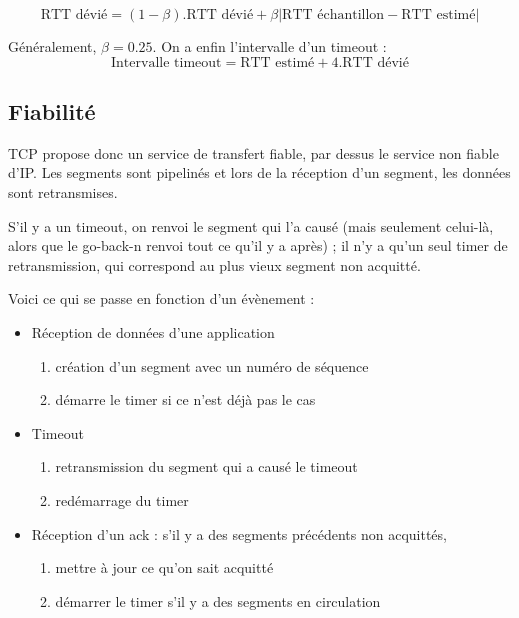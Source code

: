 	$$\text{RTT dévié} = (1 - \beta) . \text{RTT dévié} + \beta \vert \text{RTT échantillon} - \text{RTT estimé}\vert$$
	
	Généralement, $\beta = 0.25$. On a enfin l'intervalle d'un timeout :
	$$\text{Intervalle timeout} = \text{RTT estimé} + 4 . \text{RTT dévié}$$
	
	\subsection{Fiabilité}
	
	TCP propose donc un service de transfert fiable, par dessus le service non fiable d'IP. Les segments sont pipelinés et lors de la réception d'un segment, les données sont retransmises. 
	
	S'il y a un timeout, on renvoi le segment qui l'a causé (mais seulement celui-là, alors que le go-back-n renvoi tout ce qu'il y a après) ; il n'y a qu'un seul timer de retransmission, qui correspond au plus vieux segment non acquitté.



Voici ce qui se passe en fonction d'un évènement : 		 		
\begin{itemize} 			
\item Réception de données d'une application 			
\begin{enumerate} 				
	\item création d'un segment avec un numéro de séquence 				
	\item démarre le timer si ce n'est déjà pas le cas 						\end{enumerate} 
				
\item Timeout 			
\begin{enumerate} 				
	\item retransmission du segment qui a causé le timeout 				
	\item redémarrage du timer 			
\end{enumerate} 	
		
\item Réception d'un ack : s'il y a des segments précédents non acquittés, 			
\begin{enumerate} 				
	\item mettre à jour ce qu'on sait acquitté 				
	\item démarrer le timer s'il y a des segments en circulation 			\end{enumerate} 		
\end{itemize} 		 		


